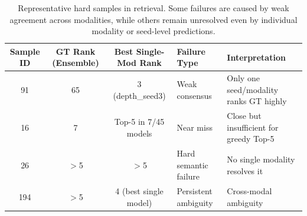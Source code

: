 \begin{table}[htbp]
\centering
\caption{Representative hard samples in retrieval. Some failures are caused by weak agreement across modalities, while others remain unresolved even by individual modality or seed-level predictions.}
\label{tab:hard_samples}
\begin{tabular}{ccclp{5cm}}
\toprule
\textbf{Sample ID} & \textbf{GT Rank (Ensemble)} & \textbf{Best Single-Mod Rank} & \textbf{Failure Type} & \textbf{Interpretation} \\
\midrule
91 & 65 & 3 (depth\_seed3) & Weak consensus & Only one seed/modality ranks GT highly \\
16 & 7 & Top-5 in 7/45 models & Near miss & Close but insufficient for greedy Top-5 \\
26 & $>$5 & $>$5 & Hard semantic failure & No single modality resolves it \\
194 & $>$5 & 4 (best single model) & Persistent ambiguity & Cross-modal ambiguity \\
\bottomrule
\end{tabular}
\end{table}
